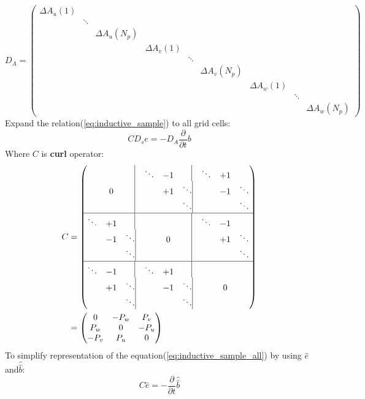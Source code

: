 \begin{equation}
D_{A}=
	\begin{pmatrix}
	\Delta A_{u}(1)&&&&&&&&\\
	&\ddots &&&&&&&\\
	&&\Delta A_{u}(N_{p})&&&&&&\\
	&&&\Delta A_{v}(1)&&&&&\\
	&&&&\ddots &&&&\\
	&&&&&\Delta A_{v}(N_{p})&&&\\
	&&&&&&\Delta A_{w}(1)&&\\
	&&&&&&&\ddots &\\
	&&&&&&&&\Delta A_{w}(N_{p})
	\end{pmatrix}
	\label{eq:Da_matrix}
\end{equation}
Expand the relation(\ref{eq:inductive_sample}) to all grid cells\cite{FIT_discrete_method}\cite{FIT_discrete_electrommagnetism}\cite{FIT_triangular_discretization}\cite{script_FeldSim}:
\begin{equation}
CD_{s}e=-D_{A}\frac{\partial}{\partial{t}}b
\label{eq:inductive_sample_all}
\end{equation}
Where $C$ is \textbf{curl} operator:
\begin{align}
C&=
	\begin{pmatrix}
	&&\quad\vline &\ddots &-1&\quad\vline  &\ddots &+1&\\	
	&0&\quad\vline	& &+1 &\ddots\vline	 &&-1&\ddots\\
	&&\quad\vline	&&&\ddots\vline			 &&&\ddots\\	
	\hline
	\ddots &+1&\quad\vline	&&&\quad\vline	 &\ddots &-1&\\
	&-1 &\ddots\vline	&&0&\quad\vline	&&+1&\ddots\\
	&&\ddots\vline	&&&\quad\vline	&&&\ddots\\
	\hline
	\ddots &-1&\quad\vline &\ddots &+1&\quad\vline	&&&\\
	&+1 &\ddots\vline	&&-1&\ddots\vline	&&0&\\
	&&\ddots\vline		&&&\ddots\vline	&&&
	\end{pmatrix}\nonumber\\
	&=
	\begin{pmatrix}
	0&-P_{w}&P_{v}\\
	P_{w}&0&-P_{u}\\
	-P_{v}&P_{u}&0
	\end{pmatrix}
\label{eq:C_matrix}
\end{align}
To simplify representation of the equation(\ref{eq:inductive_sample_all}) by using $\widehat{e}$and$\widehat{\widehat{b}}$:
\begin{equation}
C\widehat{e}=-\frac{\partial}{\partial{t}}\widehat{\widehat{b}}
\label{eq:inductive_integral_all}
\end{equation}

